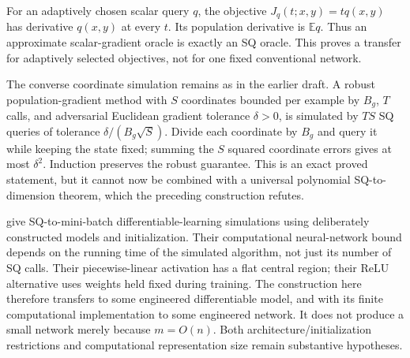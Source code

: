 \documentclass[11pt]{article}
\newcommand{\E}{\mathbb E}
\newcommand{\1}{\mathbf 1}
\begin{document}
For an adaptively chosen scalar query $q$, the objective $J_q(t;x,y)=tq(x,y)$ has derivative $q(x,y)$ at every $t$. Its population derivative is $\E q$. Thus an approximate scalar-gradient oracle is exactly an SQ oracle. This proves a transfer for adaptively selected objectives, not for one fixed conventional network.

The converse coordinate simulation remains as in the earlier draft. A robust population-gradient method with $S$ coordinates bounded per example by $B_g$, $T$ calls, and adversarial Euclidean gradient tolerance $\delta>0$, is simulated by $TS$ SQ queries of tolerance $\delta/(B_g\sqrt S)$. Divide each coordinate by $B_g$ and query it while keeping the state fixed; summing the $S$ squared coordinate errors gives at most $\delta^2$. Induction preserves the robust guarantee. This is an exact proved statement, but it cannot now be combined with a universal polynomial SQ-to-dimension theorem, which the preceding construction refutes.

\citet[Theorem 1d and Sections 4--5]{AKMSS21} give SQ-to-mini-batch differentiable-learning simulations using deliberately constructed models and initialization. Their computational neural-network bound depends on the running time of the simulated algorithm, not just its number of SQ calls. Their piecewise-linear activation has a flat central region; their ReLU alternative uses weights held fixed during training. The construction here therefore transfers to some engineered differentiable model, and with its finite computational implementation to some engineered network. It does not produce a small network merely because $m=O(n)$. Both architecture/initialization restrictions and computational representation size remain substantive hypotheses.
\end{document}

